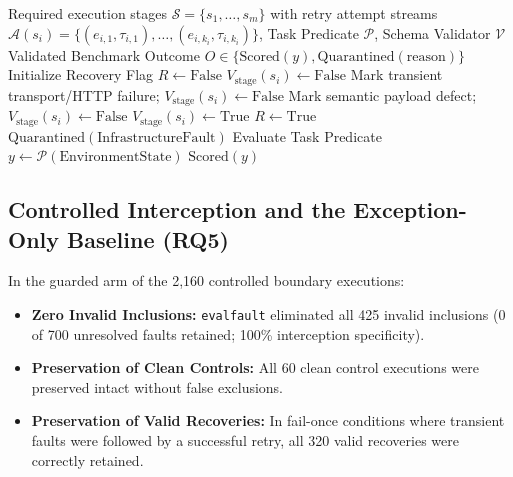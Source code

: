 \begin{algorithm}[!t]
\caption{Stage-Aware Provenance Accounting in \texttt{evalfault}}
\label{alg:evalfault}
\footnotesize
\begin{algorithmic}[1]
\REQUIRE Required execution stages $\mathcal{S} = \{s_1, \dots, s_m\}$ with retry attempt streams $\mathcal{A}(s_i) = \{(e_{i,1}, \tau_{i,1}), \dots, (e_{i,k_i}, \tau_{i,k_i})\}$, Task Predicate $\mathcal{P}$, Schema Validator $\mathcal{V}$
\ENSURE Validated Benchmark Outcome $O \in \{\text{Scored}(y), \text{Quarantined}(\text{reason})\}$
\STATE Initialize Recovery Flag $R \leftarrow \text{False}$
    \STATE $V_{\text{stage}}(s_i) \leftarrow \text{False}$
            \STATE Mark transient transport/HTTP failure; $V_{\text{stage}}(s_i) \leftarrow \text{False}$
            \STATE Mark semantic payload defect; $V_{\text{stage}}(s_i) \leftarrow \text{False}$
            \STATE {}
        \ELSE
            \STATE $V_{\text{stage}}(s_i) \leftarrow \text{True}$
                \STATE $R \leftarrow \text{True}$ 
            \ENDIF
        \ENDIF
    \ENDFOR
\ENDFOR
{}
    \RETURN $\text{Quarantined}(\text{InfrastructureFault})$ 
\ELSE
    \STATE Evaluate Task Predicate $y \leftarrow \mathcal{P}(\text{EnvironmentState})$
    \RETURN $\text{Scored}(y)$ 
\ENDIF
\end{algorithmic}
\end{algorithm}

\subsection{Controlled Interception and the Exception-Only Baseline (RQ5)}

In the guarded arm of the 2,160 controlled boundary executions:
\begin{itemize}
    \item \textbf{Zero Invalid Inclusions:} \texttt{evalfault} eliminated all 425 invalid inclusions (0 of 700 unresolved faults retained; 100\% interception specificity).
    \item \textbf{Preservation of Clean Controls:} All 60 clean control executions were preserved intact without false exclusions.
    \item \textbf{Preservation of Valid Recoveries:} In fail-once conditions where transient faults were followed by a successful retry, all 320 valid recoveries were correctly retained.
\end{itemize}

